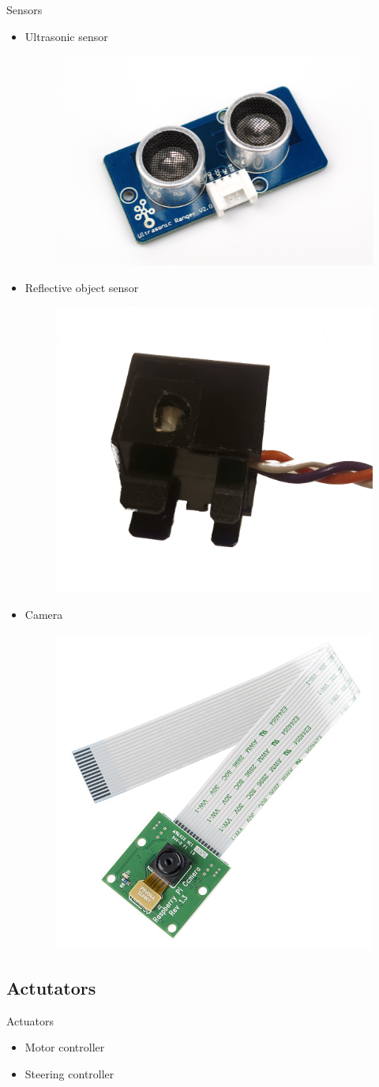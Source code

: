 \documentclass{beamer}
\begin{document}
\begin{frame}{Sensors}
    \begin{itemize}
     \item Ultrasonic sensor
    \begin{figure}
        \includegraphics[width=0.2\linewidth, left]{ultrasonic.jpg}
    \end{figure}
    \item Reflective object sensor
    \begin{figure}
        \includegraphics[width=0.2\linewidth, left]{ir.jpg}
    \end{figure}
    \item Camera
    \begin{figure}
        \includegraphics[width=0.2\linewidth, left]{camera.jpg}
    \end{figure}

    \end{itemize}

\end{frame}


\subsection{Actutators}
\begin{frame}{Actuators}
 \begin{itemize}
  \item Motor controller
  \item Steering controller
 \end{itemize}

\end{frame}
\end{document}
